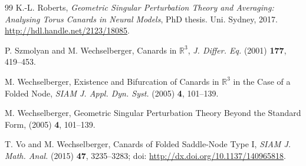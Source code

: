 \documentclass[10pt,onecolumn]{article}
\theoremstyle{plain}
\begin{document}
\begin{thebibliography}{99}
K.-L. Roberts, 
{\it Geometric Singular Perturbation Theory and Averaging: Analysing Torus Canards in Neural Models},
PhD thesis. Uni. Sydney, 2017. 
\href{http://hdl.handle.net/2123/18085}{http://hdl.handle.net/2123/18085}.

P. Szmolyan and M. Wechselberger,
Canards in $\mathbb R^3$,
{\it J. Differ. Eq.} (2001) {\bf 177}, 419--453.

M. Wechselberger,
Existence and Bifurcation of Canards in $\mathbb R^3$ in the Case of a Folded Node,
{\it SIAM J. Appl. Dyn. Syst.} (2005) {\bf 4}, 101--139.

M. Wechselberger,
Geometric Singular Perturbation Theory Beyond the Standard Form,
{\it } (2005) {\bf 4}, 101--139.

T. Vo and M. Wechselberger,
Canards of Folded Saddle-Node Type I,
{\it SIAM J. Math. Anal.} (2015) {\bf 47}, 3235--3283;
doi: \href{http://dx.doi.org/10.1137/140965818}{http://dx.doi.org/10.1137/140965818}.

\end{thebibliography}


\end{document}
